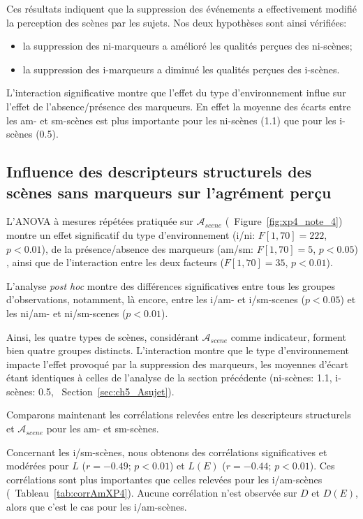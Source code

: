 Ces résultats indiquent que la suppression des événements a effectivement modifié la perception des scènes par les sujets. Nos deux hypothèses sont ainsi vérifiées:

\begin{itemize}
\item la suppression des ni-marqueurs a amélioré les qualités perçues des ni-scènes;
\item la suppression des i-marqueurs a diminué les qualités perçues des i-scènes.
\end{itemize}

L'interaction significative montre que l'effet du type d'environnement influe sur l'effet de l'absence/présence des marqueurs. En effet la moyenne des écarts entre les am- et sm-scènes est plus importante pour les ni-scènes (1.1) que pour les i-scènes (0.5). 


\subsection{Influence des descripteurs structurels des scènes sans marqueurs sur l'agrément perçu}

L'ANOVA à mesures répétées pratiquée sur $\mathcal{A}_{scene}$ (\cf~Figure~\ref{fig:xp4_note_4}) montre un effet significatif du type d'environnement (i/ni: $F[1,70]=222$, $p<0.01$), de la présence/absence des marqueurs (am/sm: $F[1,70]=5$, $p<0.05$) , ainsi que de l'interaction entre les deux facteurs ($F[1,70]=35$, $p<0.01$).

L'analyse \emph{post hoc} montre des différences significatives entre tous les groupes d'observations, notamment, là encore, entre les i/am- et i/sm-scenes ($p<0.05$) et les ni/am- et ni/sm-scenes ($p<0.01$).

Ainsi, les quatre types de scènes, considérant $\mathcal{A}_{scene}$ comme indicateur, forment bien quatre groupes distincts. L'interaction montre que le type d'environnement impacte l'effet provoqué par la suppression des marqueurs, les moyennes d'écart étant identiques à celles de l'analyse de la section précédente (ni-scènes: 1.1,  i-scènes: 0.5, \cf~Section~\ref{sec:ch5_Asujet}). 

Comparons maintenant les corrélations relevées entre les descripteurs structurels et $\mathcal{A}_{scene}$ pour les am- et sm-scènes.

Concernant les i/sm-scènes, nous obtenons des corrélations significatives et modérées pour $L$ ($r=-0.49$; $p<0.01$) et  $L(E)$ ($r=-0.44$; $p<0.01$). Ces corrélations sont plus importantes que celles relevées pour les i/am-scènes (\cf~Tableau~\ref{tab:corrAmXP4}). Aucune corrélation n'est observée sur $D$ et $D(E)$, alors que c'est le cas pour les i/am-scènes.

